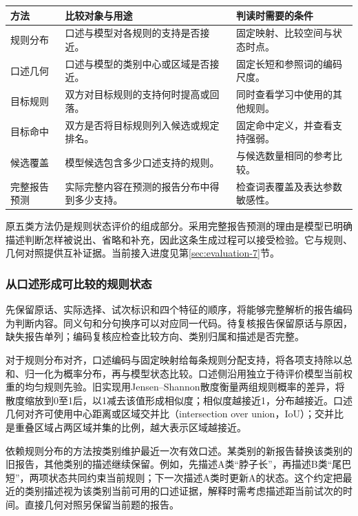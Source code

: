 \documentclass[12pt]{article}
\begin{document}
{\small
\begin{longtable}{L{2.6cm}L{6.1cm}L{4.6cm}}
\toprule
方法 & 比较对象与用途 & 判读时需要的条件\\
\midrule
\endhead
规则分布 & 口述与模型对各规则的支持是否接近。 & 固定映射、比较空间与状态时点。\\
口述几何 & 口述与模型的类别中心或区域是否接近。 & 固定长短和参照词的编码尺度。\\
目标规则 & 双方对目标规则的支持何时提高或回落。 & 同时查看学习中使用的其他规则。\\
目标命中 & 双方是否将目标规则列入候选或规定排名。 & 固定命中定义，并查看支持强弱。\\
候选覆盖 & 模型候选包含多少口述支持的规则。 & 与候选数量相同的参考比较。\\
完整报告预测 & 实际完整内容在预测的报告分布中得到多少支持。 & 检查词表覆盖及表达参数敏感性。\\
\bottomrule
\end{longtable}
}


原五类方法仍是规则状态评价的组成部分。采用完整报告预测的理由是模型已明确描述判断怎样被说出、省略和补充，因此这条生成过程可以接受检验。它与规则、几何对照提供互补证据。当前接入进度见第\ref{sec:evaluation-7}节。

\subsubsection{从口述形成可比较的规则状态}

先保留原话、实际选择、试次标识和四个特征的顺序，将能够完整解析的报告编码为判断内容。同义句和分句换序可以对应同一代码。待复核报告保留原话与原因，缺失报告单列；编码复核应检查比较方向、类别归属和描述是否完整。

对于规则分布对齐，口述编码与固定映射给每条规则分配支持，将各项支持除以总和、归一化为概率分布，再与模型状态比较。口述侧沿用独立于待评价模型当前权重的均匀规则先验。旧实现用Jensen–Shannon散度衡量两组规则概率的差异，将散度缩放到0至1后，以1减去该值形成相似度；相似度越接近1，分布越接近。口述几何对齐可使用中心距离或区域交并比（intersection over union，IoU）；交并比是重叠区域占两区域并集的比例，越大表示区域越接近。

依赖规则分布的方法按类别维护最近一次有效口述。某类别的新报告替换该类别的旧报告，其他类别的描述继续保留。例如，先描述A类“脖子长”，再描述B类“尾巴短”，两项状态共同约束当前规则；下一次描述A类时更新A的状态。这个约定把最近的类别描述视为该类别当前可用的口述证据，解释时需考虑描述距当前试次的时间。直接几何对照另保留当前题的报告。
\end{document}
